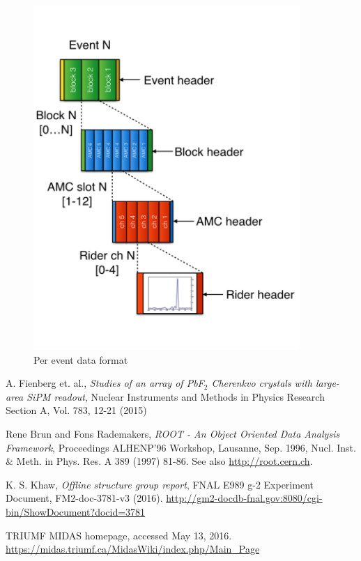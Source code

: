 \documentclass[12pt,letterpaper]{article}
\begin{document}
\begin{figure}[htbp]
\centering
\includegraphics[width=0.9\textwidth]{pics/AllHeaders}
\caption{Per event data format}
\end{figure}


\newpage

\begin{thebibliography}{99}
A. Fienberg et. al.,
\emph{Studies of an array of PbF$_{2}$ Cherenkvo crystals with large-area SiPM readout},
Nuclear Instruments and Methods in Physics Research Section A, Vol. 783, 12-21 (2015)

Rene Brun and Fons Rademakers, 
\emph{ROOT - An Object Oriented Data Analysis Framework},
Proceedings ALHENP'96 Workshop, Lausanne, Sep. 1996, Nucl. Inst. \& Meth. in Phys. Res. A 389 (1997) 81-86. See also \url{http://root.cern.ch}.

K. S. Khaw,
\emph{Offline structure group report},
FNAL E989 g-2 Experiment Document, FM2-doc-3781-v3 (2016). \url{http://gm2-docdb-fnal.gov:8080/cgi-bin/ShowDocument?docid=3781}

TRIUMF MIDAS homepage, accessed May 13, 2016. 
\url{https://midas.triumf.ca/MidasWiki/index.php/Main_Page}

\end{thebibliography}
\end{document}
